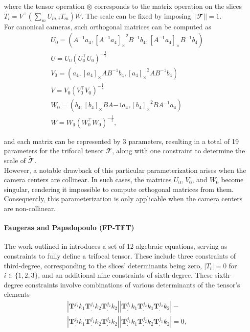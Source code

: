 where the tensor operation \( \otimes \) corresponds to the matrix operation on the slices \( \widetilde{T_i} = V^\top (\sum_{m}U_{m,i}T_m) W \). The scale can be fixed by imposing \( || \bm{\widetilde{\mathbfcal{T}}} || = 1 \).\\

For canonical cameras, such orthogonal matrices can be computed as
\begin{equation}
	\begin{gathered}
		U_0 = (A^{-1}a_4, {[A^{-1}a_4]_{\times}}^2B^{-1}b_4, [A^{-1}a_4]_{\times}B^{-1}b_4)\\
		U = U_0(U_0^\top U_0)^{-\frac{1}{2}}\\
		V_0 = (a_4, [a_4]_{\times}AB^{-1}b_4, {[a_4]_{\times}}^2AB^{-1}b_4)\\
		V = V_0(V_0^\top V_0)^{-\frac{1}{2}}\\
		W_0 = (b_4, [b_4]_{\times}BA{-1}a_4, {[b_4]_{\times}}^2BA^{-1}a_4)\\
		W = W_0(W_0^\top W_0)^{-\frac{1}{2}},
	\end{gathered}
\end{equation}

and each matrix can be represented by 3 parameters, resulting in a total of 19 parameters for the trifocal tensor \( \mathbfcal{T} \), along with one constraint to determine the scale of \( \bm{\widetilde{\mathbfcal{T}}} \).\\

However, a notable drawback of this particular parameterization arises when the camera centers are collinear. In such cases, the matrices \( U_0 \), \( V_0 \), and \( W_0 \) become singular, rendering it impossible to compute orthogonal matrices from them. Consequently, this parameterization is only applicable when the camera centers are non-collinear.

\paragraph{Faugeras and Papadopoulo (\acs{FP-TFT})}
The work outlined in \cite{7-faugeras-papadopoulo-param} introduces a set of 12 algebraic equations, serving as constraints to fully define a trifocal tensor. These include three constraints of third-degree, corresponding to the slices' determinants being zero, \( |T_i| = 0 \) for \( i \in \{1, 2, 3\} \), and an additional nine constraints of sixth-degree. These sixth-degree constraints involve combinations of various determinants of the tensor's elements
\begin{equation}
	\begin{gathered}
		| \bm{T}_.^{j_1}{k_1}\bm{T}_.^{j_1}{k_2}\bm{T}_.^{j_2}{k_2} | | \bm{T}_.^{j_1}{k_1}\bm{T}_.^{j_2}{k_1}\bm{T}_.^{j_2}{k_2} | -\\
		| \bm{T}_.^{j_2}{k_1}\bm{T}_.^{j_1}{k_2}\bm{T}_.^{j_2}{k_2} | | \bm{T}_.^{j_1}{k_1}\bm{T}_.^{j_2}{k_2}\bm{T}_.^{j_1}{k_2} | = 0,
	\end{gathered}
\end{equation}


